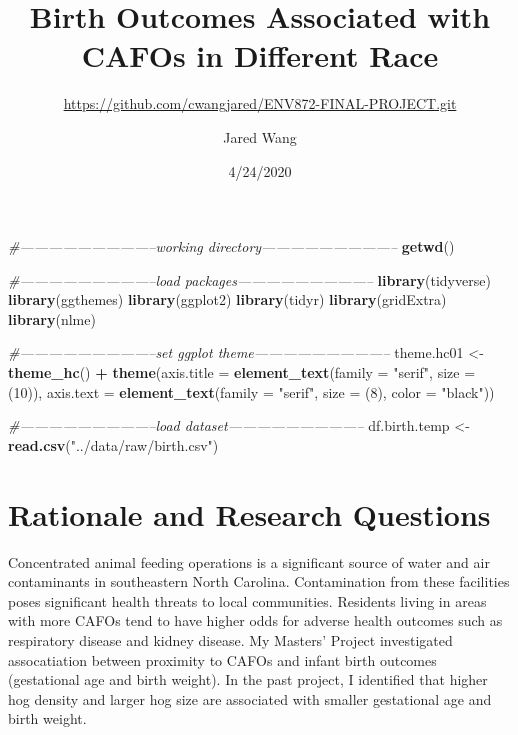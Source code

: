 \documentclass[
  12pt,
]{article}
\title{Birth Outcomes Associated with CAFOs in Different Race}
\subtitle{\url{https://github.com/cwangjared/ENV872-FINAL-PROJECT.git}}
\author{Jared Wang}
\date{4/24/2020}
\newenvironment{Shaded}{\begin{snugshade}}{\end{snugshade}}
\newcommand{\CommentTok}[1]{\textcolor[rgb]{0.56,0.35,0.01}{\textit{#1}}}
\newcommand{\DataTypeTok}[1]{\textcolor[rgb]{0.13,0.29,0.53}{#1}}
\newcommand{\DecValTok}[1]{\textcolor[rgb]{0.00,0.00,0.81}{#1}}
\newcommand{\KeywordTok}[1]{\textcolor[rgb]{0.13,0.29,0.53}{\textbf{#1}}}
\newcommand{\NormalTok}[1]{#1}
\newcommand{\OperatorTok}[1]{\textcolor[rgb]{0.81,0.36,0.00}{\textbf{#1}}}
\newcommand{\StringTok}[1]{\textcolor[rgb]{0.31,0.60,0.02}{#1}}
\begin{document}
\maketitle

\begin{Shaded}
\begin{Highlighting}[]
\CommentTok{#-----------------------------working directory-----------------------------}
\KeywordTok{getwd}\NormalTok{()}

\CommentTok{#-----------------------------load packages-----------------------------}
\KeywordTok{library}\NormalTok{(tidyverse)}
\KeywordTok{library}\NormalTok{(ggthemes)}
\KeywordTok{library}\NormalTok{(ggplot2)}
\KeywordTok{library}\NormalTok{(tidyr)}
\KeywordTok{library}\NormalTok{(gridExtra)}
\KeywordTok{library}\NormalTok{(nlme)}

\CommentTok{#-----------------------------set ggplot theme-----------------------------}
\NormalTok{theme.hc01 <-}\StringTok{ }\KeywordTok{theme_hc}\NormalTok{() }\OperatorTok{+}
\StringTok{  }\KeywordTok{theme}\NormalTok{(}\DataTypeTok{axis.title =} \KeywordTok{element_text}\NormalTok{(}\DataTypeTok{family =} \StringTok{"serif"}\NormalTok{, }\DataTypeTok{size =}\NormalTok{ (}\DecValTok{10}\NormalTok{)),}
        \DataTypeTok{axis.text =} \KeywordTok{element_text}\NormalTok{(}\DataTypeTok{family =} \StringTok{"serif"}\NormalTok{, }\DataTypeTok{size =}\NormalTok{ (}\DecValTok{8}\NormalTok{), }\DataTypeTok{color =} \StringTok{"black"}\NormalTok{))}

\CommentTok{#-----------------------------load dataset-----------------------------}
\NormalTok{df.birth.temp <-}\StringTok{ }\KeywordTok{read.csv}\NormalTok{(}\StringTok{"../data/raw/birth.csv"}\NormalTok{)}
\end{Highlighting}
\end{Shaded}

\hypertarget{rationale-and-research-questions}{%
\section{Rationale and Research
Questions}\label{rationale-and-research-questions}}

Concentrated animal feeding operations is a significant source of water
and air contaminants in southeastern North Carolina. Contamination from
these facilities poses significant health threats to local communities.
Residents living in areas with more CAFOs tend to have higher odds for
adverse health outcomes such as respiratory disease and kidney disease.
My Masters' Project investigated assocatiation between proximity to
CAFOs and infant birth outcomes (gestational age and birth weight). In
the past project, I identified that higher hog density and larger hog
size are associated with smaller gestational age and birth weight.
\end{document}
